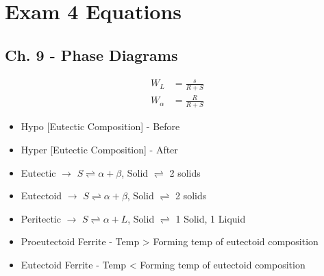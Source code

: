 \section{Exam 4 Equations} \label{sec:Exam 4 Equations}
	\subsection{Ch. 9 - Phase Diagrams} \label{subsec:Ch9 Phase Diagrams}
		\begin{align} 
			W_{L} &= \frac{s}{R+S} \\
			W_{\alpha} &= \frac{R}{R+S}
		\end{align}
		\begin{itemize}[noitemsep]
			\item Hypo [Eutectic Composition] - Before
			\item Hyper [Eutectic Composition] - After
			\item Eutectic $\rightarrow$ $S \rightleftharpoons \alpha + \beta$, Solid $\rightleftharpoons$ 2 solids
			
			\item Eutectoid $\rightarrow$ $S \rightleftharpoons \alpha + \beta$, Solid $\rightleftharpoons$ 2 solids
			
			\item Peritectic $\rightarrow$ $S \rightleftharpoons \alpha + L$, Solid $\rightleftharpoons$ 1 Solid, 1 Liquid
			
			\item Proeutectoid Ferrite - Temp > Forming temp of eutectoid composition
			\item Eutectoid Ferrite - Temp < Forming temp of eutectoid composition
		\end{itemize}
	
